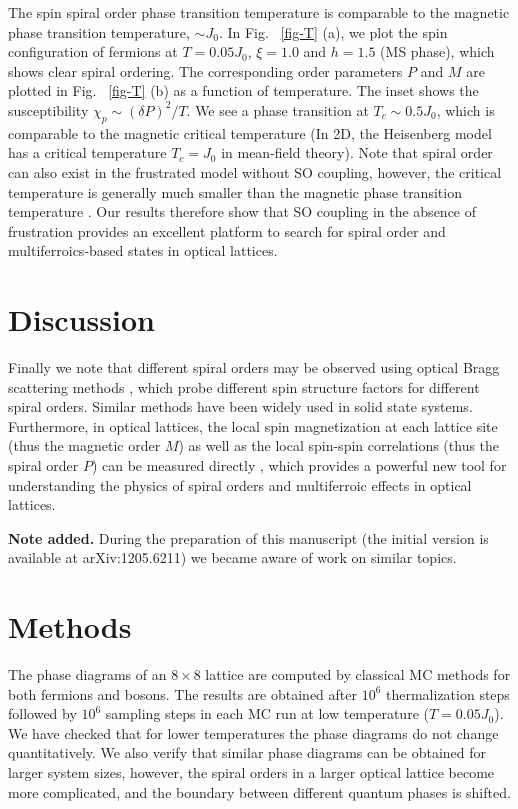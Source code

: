 \documentclass[a4paper,showpacs]{revtex4}
\begin{document}
The spin spiral order phase transition temperature is comparable to the
magnetic phase transition temperature, $\sim J_{0}$. In Fig.~ \ref{fig-T}
(a), we plot the spin configuration of fermions at $T=0.05J_{0}$, $\xi =1.0$
and $h=1.5$ (MS phase), which shows clear spiral ordering. The corresponding
order parameters $P$ and $M$ are plotted in Fig.~ \ref{fig-T} (b) as a
function of temperature. The inset shows the susceptibility $\chi _{p}\sim
(\delta P)^{2}/T$. We see a phase transition at $T_{c}\sim 0.5J_{0}$, which
is comparable to the magnetic critical temperature \cite{Duan} (In 2D, the
Heisenberg model has a critical temperature $T_{c}=J_{0}$ in mean-field
theory). Note that spiral order can also exist in the frustrated model
without SO coupling, however, the critical temperature is generally much
smaller than the magnetic phase transition temperature \cite{Jing,Blake}.
Our results therefore show that SO coupling in the absence of frustration
provides an excellent platform to search for spiral order 
and multiferroics-based states in optical lattices.

\section*{\bf Discussion}
Finally we note that different spiral orders may be observed using optical Bragg scattering methods \cite{Corcovilos}, which probe different
spin structure factors for different spiral orders. Similar methods have
been widely used in solid state systems. Furthermore, in optical lattices,
the local spin magnetization at each lattice site (thus the magnetic order $%
M $) as well as the local spin-spin correlations (thus the spiral order $P$)
can be measured directly \cite{Greiner2,Bloch}, which provides a powerful
new tool for understanding the physics of spiral orders and multiferroic
effects in optical lattices.

\noindent  \textbf{\small {Note added.}} During the preparation of this manuscript
(the initial version is available at arXiv:1205.6211) we became aware of
work \cite{Radic,Cole,Wu} on similar topics.

\section*{\bf Methods}
The phase diagrams of an $8\times 8$ lattice are computed by classical MC methods for both fermions and bosons. The results are obtained after $10^{6}$ thermalization steps followed by $10^{6}$ sampling steps in each MC run at low temperature ($T=0.05J_{0}$). We have checked that for lower temperatures the phase diagrams do not change quantitatively. We also verify that similar phase diagrams can be obtained for larger system sizes, however, the spiral orders in a larger optical lattice become more complicated, and the boundary between different quantum phases is shifted.
\end{document}
